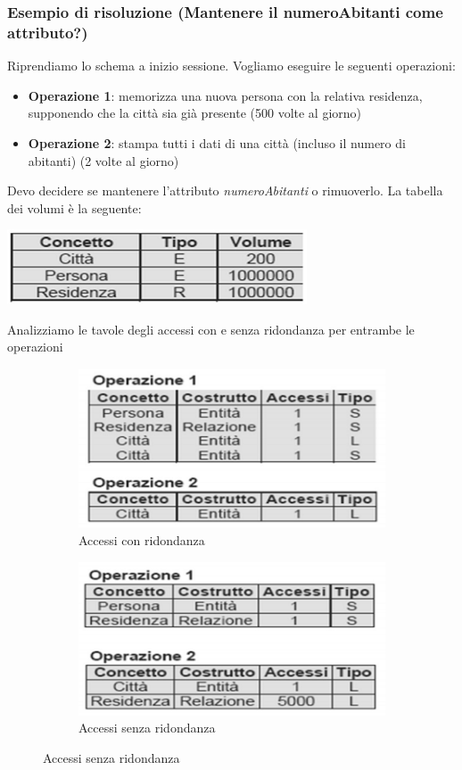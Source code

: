\subsubsection{Esempio di risoluzione (Mantenere il numeroAbitanti come attributo?)} Riprendiamo lo schema a inizio sessione. Vogliamo eseguire le seguenti operazioni:
\begin{itemize}
	\item \textbf{Operazione 1}: memorizza una nuova persona con la relativa residenza, supponendo che la città sia già presente (500 volte al giorno)
	\item \textbf{Operazione 2}: stampa tutti i dati di una città (incluso il numero di abitanti) (2 volte al giorno)
\end{itemize}
Devo decidere se mantenere l'attributo \emph{numeroAbitanti} o rimuoverlo. La tabella dei volumi è la seguente:
\begin{center}
	\includegraphics{images/113.PNG}
\end{center}
Analizziamo le tavole degli accessi con e senza ridondanza per entrambe le operazioni
\begin{figure}[h]
	\begin{subfigure}{0.5\textwidth}
		\includegraphics{images/114.PNG} 
		\caption{Accessi con ridondanza}
	\end{subfigure}
	\begin{subfigure}{0.5\textwidth}
		\includegraphics{images/115.PNG}
		\caption{Accessi senza ridondanza}
	\end{subfigure}
\end{figure}
